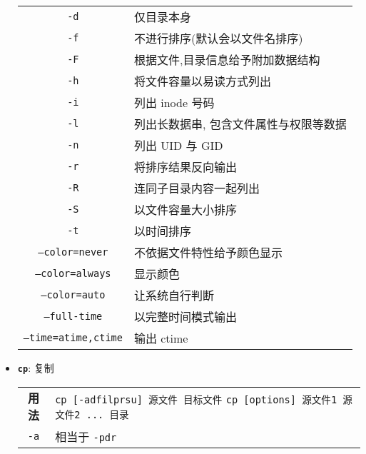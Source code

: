 \begin{itemize}
\begin{longtable}{c@{: }p{}}
    \texttt{-d} & 仅目录本身 \\

    \texttt{-f} & 不进行排序(默认会以文件名排序) \\

    \texttt{-F} & 根据文件,目录信息给予附加数据结构 \\

    \texttt{-h} & 将文件容量以易读方式列出 \\

    \texttt{-i} & 列出 inode 号码 \\

   \texttt{-l} & 列出长数据串, 包含文件属性与权限等数据 \\

    \texttt{-n} & 列出 UID 与 GID \\

    \texttt{-r} & 将排序结果反向输出 \\

    \texttt{-R} & 连同子目录内容一起列出 \\

    \texttt{-S} & 以文件容量大小排序 \\

    \texttt{-t} & 以时间排序 \\

    \texttt{--color=never} & 不依据文件特性给予颜色显示 \\

    \texttt{--color=always} & 显示颜色 \\

    \texttt{--color=auto} & 让系统自行判断 \\

    \texttt{--full-time} & 以完整时间模式输出 \\

    \texttt{--time={atime,ctime}} & 输出 ctime \\

    \hline
  \end{longtable}

\item \textbf{\texttt{cp}}: 复制
  \begin{longtable}{c@{: }p{}}\hline\hline

    \textbf{用法} & \verb"cp [-adfilprsu] 源文件 目标文件" \newline
                    \verb"cp [options] 源文件1 源文件2 ... 目录"
    \\

    \texttt{-a} & 相当于 \texttt{-pdr}  \\


\end{longtable}
\end{itemize}
